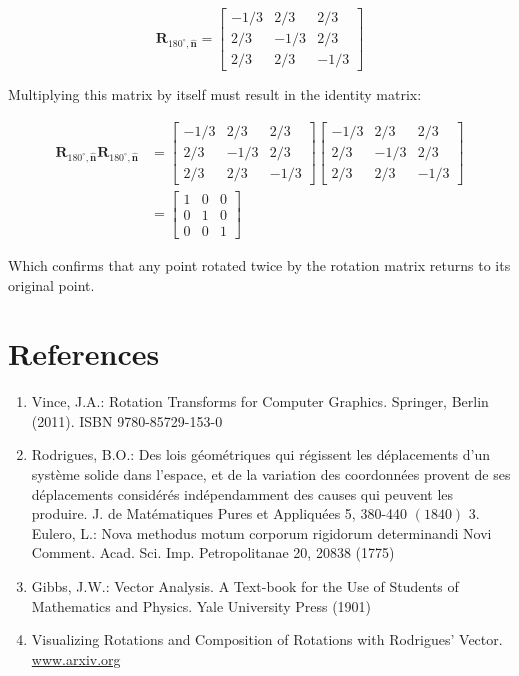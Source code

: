 \documentclass[10pt]{article}
\begin{document}
$$
\mathbf{R}_{180^{\circ}, \hat{\mathbf{n}}}=\left[\begin{array}{ccc}
-1 / 3 & 2 / 3 & 2 / 3 \\
2 / 3 & -1 / 3 & 2 / 3 \\
2 / 3 & 2 / 3 & -1 / 3
\end{array}\right]
$$

Multiplying this matrix by itself must result in the identity matrix:

$$
\begin{aligned}
\mathbf{R}_{180^{\circ}, \hat{\mathbf{n}}} \mathbf{R}_{180^{\circ}, \hat{\mathbf{n}}} & =\left[\begin{array}{ccc}
-1 / 3 & 2 / 3 & 2 / 3 \\
2 / 3 & -1 / 3 & 2 / 3 \\
2 / 3 & 2 / 3 & -1 / 3
\end{array}\right]\left[\begin{array}{ccc}
-1 / 3 & 2 / 3 & 2 / 3 \\
2 / 3 & -1 / 3 & 2 / 3 \\
2 / 3 & 2 / 3 & -1 / 3
\end{array}\right] \\
& =\left[\begin{array}{lll}
1 & 0 & 0 \\
0 & 1 & 0 \\
0 & 0 & 1
\end{array}\right]
\end{aligned}
$$

Which confirms that any point rotated twice by the rotation matrix returns to its original point.

\section{References}
\begin{enumerate}
  \item Vince, J.A.: Rotation Transforms for Computer Graphics. Springer, Berlin (2011). ISBN 9780-85729-153-0

  \item Rodrigues, B.O.: Des lois géométriques qui régissent les déplacements d'un système solide dans l'espace, et de la variation des coordonnées provent de ses déplacements considérés indépendamment des causes qui peuvent les produire. J. de Matématiques Pures et Appliquées 5, 380-440 $(1840)$ 3. Eulero, L.: Nova methodus motum corporum rigidorum determinandi Novi Comment. Acad. Sci. Imp. Petropolitanae 20, 20838 (1775)

  \item Gibbs, J.W.: Vector Analysis. A Text-book for the Use of Students of Mathematics and Physics. Yale University Press (1901)

  \item Visualizing Rotations and Composition of Rotations with Rodrigues' Vector. \href{http://www.arxiv.org}{www.arxiv.org}

\end{enumerate}
\end{document}
